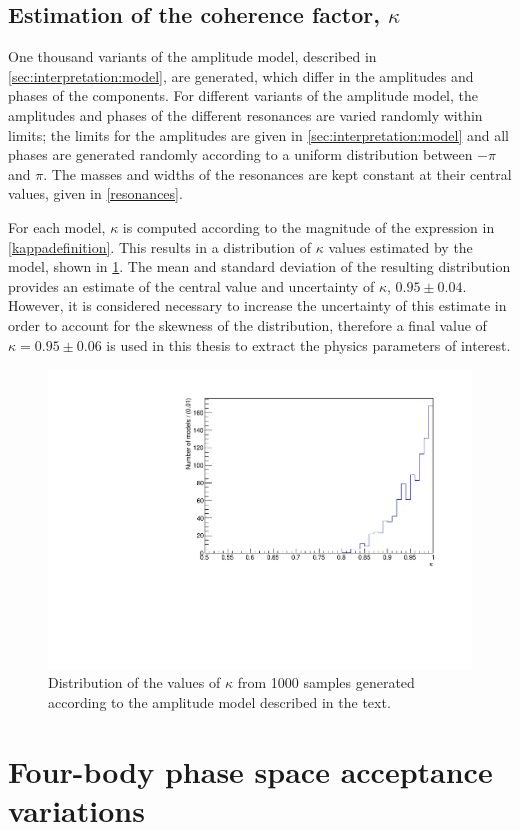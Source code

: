 \subsection{Estimation of the coherence factor, $\kappa$}
\label{sec:interpretation:kappa}

One thousand variants of the amplitude model, described in \sect\ref{sec:interpretation:model}, are generated, which differ in the amplitudes and phases of the components. For different variants of the amplitude model, the amplitudes and phases of the different resonances are varied randomly within limits; the limits for the amplitudes are given in \sect\ref{sec:interpretation:model} and all phases are generated randomly according to a uniform distribution between $-\pi$ and $\pi$. The masses and widths of the resonances are kept constant at their central values, given in \tab\ref{resonances}. 

For each model, $\kappa$ is computed according to the magnitude of the expression in \eqn\ref{kappadefinition}. This results in a distribution of $\kappa$ values estimated by the model, shown in \fig\ref{kappadistribution}. The mean and standard deviation of the resulting distribution provides an estimate of the central value and uncertainty of $\kappa$,  $0.95 \pm 0.04$. However, it is considered necessary to increase the uncertainty of this estimate in order to account for the skewness of the distribution, therefore a final value of $\kappa = 0.95 \pm 0.06$ is used in this thesis to extract the physics parameters of interest.

\begin{figure}[h]
\centering
\includegraphics[trim = 0mm 0mm 0mm 8mm, clip, width=0.5\linewidth]{figures/results/kappa.pdf}
\caption{Distribution of the values of $\kappa$ from 1000 samples generated according to the amplitude model described in the text.}
\label{kappadistribution}
\end{figure}

\section{Four-body phase space acceptance variations}
\label{sec:interpretation:inputs}

